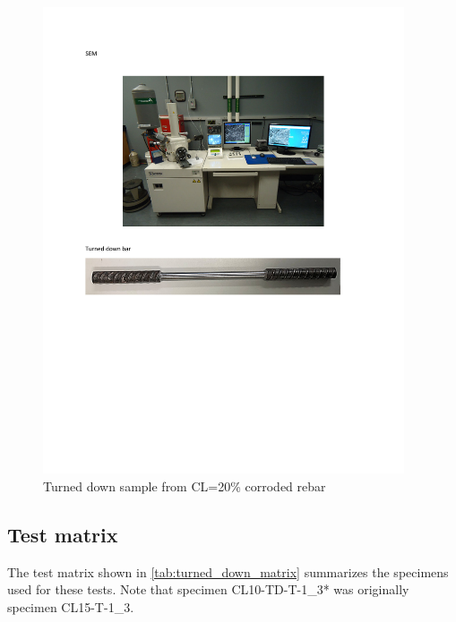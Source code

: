 \begin{figure}[htbp]
    \centering
    \includegraphics[width=0.95\textwidth]{VAC Thesis 2.0/Chapter-3/figs/turned_down_bar.pdf}
    \caption{Turned down sample from CL=20\% corroded rebar}
    \label{fig:turned_down_bar}
\end{figure}


\subsection{Test matrix}

The test matrix shown in \ref{tab:turned_down_matrix} summarizes the specimens used for these tests. Note that specimen CL10-TD-T-1\_3* was originally specimen CL15-T-1\_3.

